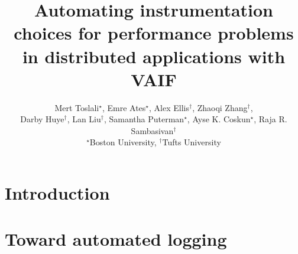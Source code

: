 

\date{}

\title{Automating instrumentation choices for performance problems in distributed applications with VAIF}
\author{Mert Toslali$^{\star}$, Emre Ates$^{\star}$, Alex Ellis$^{\dagger}$, Zhaoqi Zhang$^{\dagger}$, \\
Darby Huye$^{\dagger}$, Lan Liu$^{\dagger}$, Samantha Puterman$^{\star}$, Ayse K. Coskun$^{\star}$, Raja R. Sambasivan$^{\dagger}$
  \\{$^{\star}$Boston University, $^{\dagger}$Tufts University}
}
\maketitle

\begin{abstract}

\end{abstract}


\section{Introduction}




\section{Toward automated logging}



